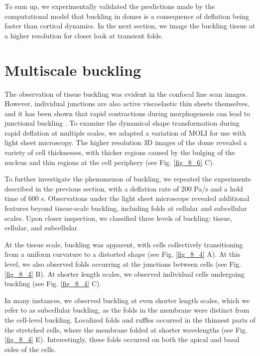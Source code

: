 To sum up, we experimentally validated the predictions made by the computational model that buckling in domes is a consequence of deflation being faster than cortical dynamics. In the next section, we image the buckling tissue at a higher resolution for closer look at transient folds.


\hypertarget{multiscale-buckling}{%
	\section{Multiscale buckling}\label{multiscale-buckling}}

The observation of tissue buckling was evident in the confocal line scan images. However, individual junctions are also active viscoelastic thin sheets themselves, and it has been shown that rapid contractions during morphogenesis can lead to junctional buckling \cite{Sumi:2018aa}. To examine the dynamical shape transformation during rapid deflation at multiple scales, we adapted a variation of MOLI for use with light sheet microscopy. The higher resolution 3D images of the dome revealed a variety of cell thicknesses, with thicker regions caused by the bulging of the nucleus and thin regions at the cell periphery (see Fig. \ref{fig_8_6} C).

To further investigate the phenomenon of buckling, we repeated the experiments described in the previous section, with a deflation rate of 200 Pa/s and a hold time of 600 s. Observations under the light sheet microscope revealed  additional features beyond tissue-scale buckling, including folds at cellular and subcellular scales. Upon closer inspection, we classified three levels of buckling: tissue, cellular, and subcellular.

At the tissue scale, buckling was apparent, with cells collectively transitioning from a uniform curvature to a distorted shape (see Fig. \ref{fig_8_4} A). At this level, we also observed folds occurring at the junctions between cells (see Fig. \ref{fig_8_4} B). At shorter length scales, we observed individual cells undergoing buckling (see Fig. \ref{fig_8_4} C).

In many instances, we observed buckling at even shorter length scales, which we refer to as subcellular buckling, as the folds in the membrane were distinct from the cell-level buckling. Localized folds and ruffles occurred in the thinnest parts of the stretched cells, where the membrane folded at shorter wavelengths (see Fig. \ref{fig_8_4} E). Interestingly, these folds occurred on both the apical and basal sides of the cells.

